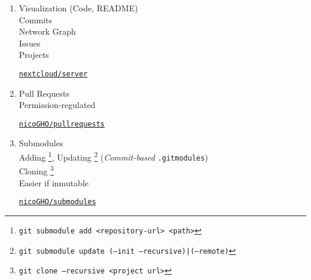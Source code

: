 \documentclass[12pt,a4paper]{article}
\begin{document}
\begin{enumerate}
\begin{tikzpicture}[
			node/.style={circle, draw, fill=black, inner sep=2pt}
			]
			
		\end{tikzpicture}
		
				
		\newpage
		\item Visualization (Code, README) \\ Commits \\ Network Graph \\ Issues \\ Projects
		
		\vspace{1cm}
		\href{https://github.com/nextcloud/server}{\texttt{nextcloud/server}}
		
		\newpage
		\item Pull Requests \\ Permission-regulated
		
		\vspace{1cm}
		\href{https://github.com/nicoGHO/pullrequests}{\texttt{nicoGHO/pullrequests}}
		
		\newpage
		\item Submodules \\
		Adding \footnote{\texttt{git submodule add <repository-url> <path>}}, Updating \footnote{\texttt{git submodule update (--init --recursive)|(--remote)}} (\emph{Commit-based} \texttt{.gitmodules}) \\ Cloning \footnote{\texttt{git clone --recursive <project url>}} \\ Easier if inmutable
		
		\vspace{1cm}
		\href{https://github.com/nicoGHO/submodules}{\texttt{nicoGHO/submodules}}
		
		\vspace{2cm}
		
\end{enumerate}
\end{document}
